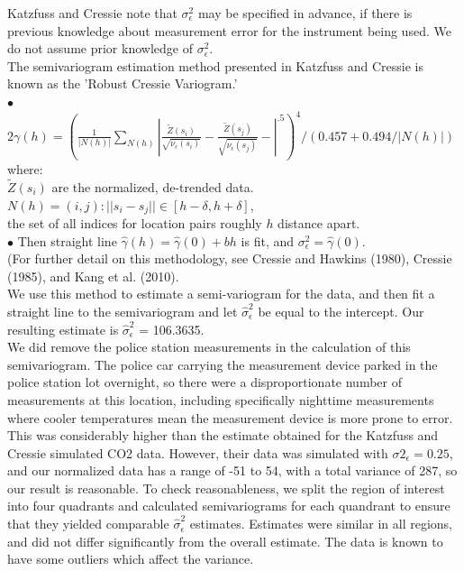 \documentclass[11pt]{article}
\newcommand{\myindent}{\hspace*{1cm}}
\begin{document}
Katzfuss and Cressie note that $\sigma^2_\epsilon$ may be specified in advance, if there is previous knowledge about measurement error for the instrument being used.  We do not assume prior knowledge of $\sigma^2_\epsilon$. \\

The semivariogram estimation method presented in Katzfuss and Cressie is known as the 'Robust Cressie Variogram.'  \\

\myindent $\bullet$ $2\gamma(h) = \left( \frac{1}{|N(h)|} \sum_{N(h)}|
\frac{\tilde{Z}(s_i)}{\sqrt{\nu_\epsilon (s_i)}} - 
\frac{\tilde{Z}(s_j)}{\sqrt{\nu_\epsilon (s_j)}} - 
|^{.5} \right)^4 / \left(0.457 + 0.494 / |N(h)|\right)$ \\

\myindent\myindent where: \\
\myindent \myindent  $\tilde{Z}(s_i)$ are the normalized, de-trended data. \\
\myindent \myindent $N(h) = {(i,j): ||s_i - s_j|| \in [h - \delta, h + \delta ] }$, \\
\myindent \myindent \myindent the set of all indices for location pairs roughly $h$ distance apart.\\

\myindent $\bullet$ Then straight line $\hat{\gamma}(h) = \hat{\gamma}(0) + bh$ is fit, and $\sigma^2_\epsilon = \hat{\gamma}(0)$.\\

(For further detail on this methodology, see Cressie and Hawkins (1980), Cressie (1985), and Kang et al. (2010). \\

We use this method to estimate a semi-variogram for the data, and then fit a straight line to the semivariogram and let $\hat{\sigma}^2_\epsilon$ be equal to the intercept.  Our resulting estimate is $\hat{\sigma}^2_\epsilon$ = 106.3635. \\

We did remove the police station measurements in the calculation of this semivariogram.  The police car carrying the measurement device parked in the police station lot overnight, so there were a disproportionate number of measurements at this location, including specifically nighttime measurements where cooler temperatures mean the measurement device is more prone to error. \\

This was considerably higher than the estimate obtained for the Katzfuss and Cressie simulated CO2 data.  However, their data was simulated with $\sigma2_\epsilon = 0.25$, and our normalized data has a range of -51 to 54, with a total variance of 287, so our result is reasonable. To check reasonableness, we split the region of interest into four quadrants and calculated semivariograms for each quandrant to ensure that they yielded comparable $\hat{\sigma}^2_\epsilon$ estimates. Estimates were similar in all regions, and did not differ significantly from the overall estimate.   The data is known to have some outliers which affect the variance.\\
\end{document}
